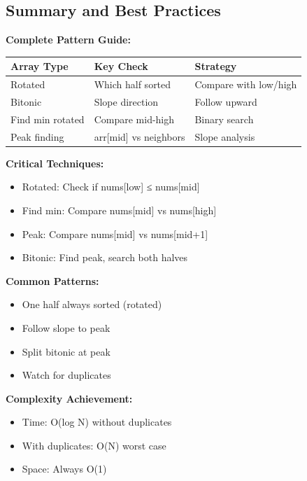 \documentclass[11pt,a4paper,oneside]{book}
\begin{document}
\subsection{Summary and Best Practices}

\begin{tcolorbox}[
    enhanced,breakable,
    colback=primaryblue!10,
    colframe=primaryblue,
    boxrule=2pt,
    arc=4mm,
    title=\textbf{Sorted Array Variations: Complete Mastery}
]
\textbf{Complete Pattern Guide:}

\begin{center}
\begin{tabular}{|l|l|l|}
\hline
\rowcolor{lightgray}
\textbf{Array Type} & \textbf{Key Check} & \textbf{Strategy} \\
\hline
Rotated & Which half sorted & Compare with low/high \\
\hline
Bitonic & Slope direction & Follow upward \\
\hline
Find min rotated & Compare mid-high & Binary search \\
\hline
Peak finding & arr[mid] vs neighbors & Slope analysis \\
\hline
\end{tabular}
\end{center}

\textbf{Critical Techniques:}
\begin{itemize}
    \item  Rotated: Check if nums[low] ≤ nums[mid]
    \item  Find min: Compare nums[mid] vs nums[high]
    \item  Peak: Compare nums[mid] vs nums[mid+1]
    \item  Bitonic: Find peak, search both halves
\end{itemize}

\textbf{Common Patterns:}
\begin{itemize}
    \item One half always sorted (rotated)
    \item Follow slope to peak
    \item Split bitonic at peak
    \item Watch for duplicates
\end{itemize}

\textbf{Complexity Achievement:}
\begin{itemize}
    \item Time: O(log N) without duplicates
    \item With duplicates: O(N) worst case
    \item Space: Always O(1)
\end{itemize}
\end{tcolorbox}
\end{document}
